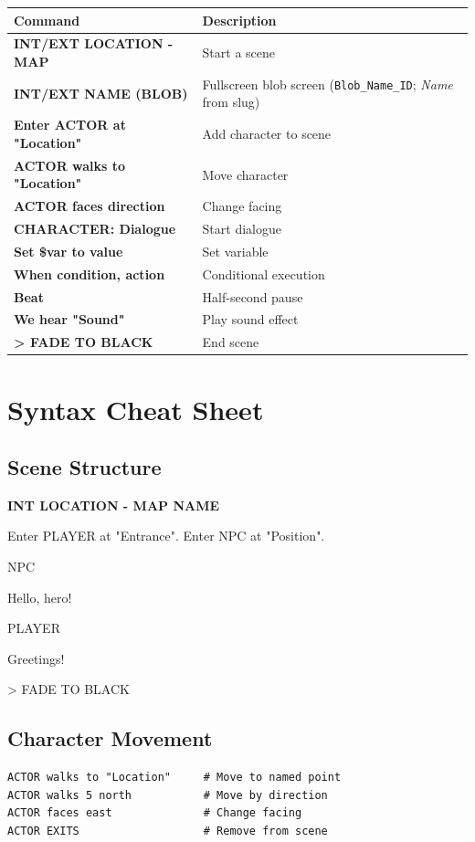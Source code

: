 \documentclass[11pt,letterpaper,oldstylefigures]{memoir}
\newcommand{\slugline}[1]{\nobreak\textbf{\MakeUppercase{#1}}\par\nobreak\vspace{1\baselineskip}}
\newcommand{\speaker}[1]{\nobreak\hspace*{0.333\textwidth}\MakeUppercase{#1}\par\nobreak\vspace{0.5\baselineskip}}
\newcommand{\dialogue}[1]{\nobreak\hspace*{0.25\textwidth}\begin{minipage}{0.5\textwidth}#1\end{minipage}\par\vspace{1\baselineskip}}
\newcommand{\stagedir}[1]{#1\par\vspace{1\baselineskip}}
\newenvironment{FountainExample}
  {\begingroup
  \ttfamily\small
   \setlength{\parindent}{0pt}
  \setlength{\parskip}{0.5em}
  \allowdisplaybreaks
  \setlength{\displaywidowpenalty}{0}
  \setlength{\widowpenalty}{0}
  \setlength{\clubpenalty}{0}
  \setlength{\interlinepenalty}{0}
}
  {\endgroup}
\newcommand{\sceneendcmd}[1]{\begin{flushright}\ttfamily #1\end{flushright}}
\newcommand{\fountain}[1]{\textbf{#1}}
\begin{document}
\begin{center}
\begin{tabular}{|l|l|}
\hline
\textbf{Command} & \textbf{Description} \\
\hline
\fountain{INT/EXT LOCATION - MAP} & Start a scene \\
\fountain{INT/EXT NAME (BLOB)} & Fullscreen blob screen (\texttt{Blob\_Name\_ID}; \textit{Name} from slug) \\
\fountain{Enter ACTOR at "Location"} & Add character to scene \\
\fountain{ACTOR walks to "Location"} & Move character \\
\fountain{ACTOR faces direction} & Change facing \\
\fountain{CHARACTER: Dialogue} & Start dialogue \\
\fountain{Set \$var to value} & Set variable \\
\fountain{When condition, action} & Conditional execution \\
\fountain{Beat} & Half-second pause \\
\fountain{We hear "Sound"} & Play sound effect \\
\fountain{> FADE TO BLACK} & End scene \\
\hline
\end{tabular}
\end{center}

\section{Syntax Cheat Sheet}

\subsection{Scene Structure}
\begin{FountainExample}
\slugline{INT LOCATION - MAP NAME}

\stagedir{Enter PLAYER at "Entrance".
Enter NPC at "Position".}

\speaker{NPC}
\dialogue{Hello, hero!}

\speaker{PLAYER}
\dialogue{Greetings!}

\sceneendcmd{> FADE TO BLACK}
\end{FountainExample}

\subsection{Character Movement}
\begin{verbatim}
ACTOR walks to "Location"     # Move to named point
ACTOR walks 5 north           # Move by direction
ACTOR faces east              # Change facing
ACTOR EXITS                   # Remove from scene
\end{verbatim}
\end{document}
